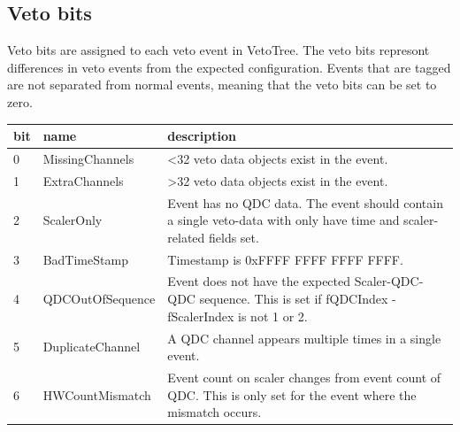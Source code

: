 \documentclass[/main.tex]{subfiles}
\begin{document}
\subsection{Veto bits} \label{sec:veto_bits}
Veto bits are assigned to each veto event in VetoTree.
The veto bits represont differences in veto events from the expected configuration.
Events that are tagged are not separated from normal events, meaning that the veto bits can be set to zero.
\par
\begin{tabular}{| l | l | p{} |} \hline
  bit & name & description \\ \hline\hline
  0  & MissingChannels  & \textless32 veto data objects exist in the event. \\ \hline
  1  & ExtraChannels    & \textgreater32 veto data objects exist in the event. \\ \hline
  2  & ScalerOnly       & Event has no QDC data. The event should contain a single veto-data with only have time and scaler-related fields set. \\ \hline
  3  & BadTimeStamp     & Timestamp is 0xFFFF FFFF FFFF FFFF.  \\ \hline\hline
  4  & QDCOutOfSequence & Event does not have the expected Scaler-QDC-QDC sequence. This is set if fQDCIndex - fScalerIndex is not 1 or 2.\\ \hline
  5  & DuplicateChannel & A QDC channel appears multiple times in a single event. \\ \hline
  6  & HWCountMismatch  & Event count on scaler changes from event count of QDC. This is only set for the event where the mismatch occurs.\\ \hline
\end{tabular}
\end{document}
